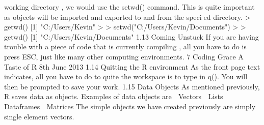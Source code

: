 working directory , we would use the setwd() command. This is quite important as objects
will be imported and exported to and from the specied directory.
> getwd()
[1] "C:/Users/Kevin"
>
> setwd("C:/Users/Kevin/Documents")
>
> getwd()
[1] "C:/Users/Kevin/Documents"
1.13 Coming Unstuck
If you are having trouble with a piece of code that is currently compiling , all you have to do
is press ESC, just like many other computing environments.
7
Coding Grace A Taste of R 8th June 2013
1.14 Quitting the R environment
As the front page text indicates, all you have to do to quite the workspace is to type in q().
You will then be prompted to save your work.
1.15 Data Objects
As mentioned previously, R saves data as objects. Examples of data objects are
 Vectors
 Lists
 Dataframes
 Matrices
The simple objects we have created previously are simply single element vectors.
